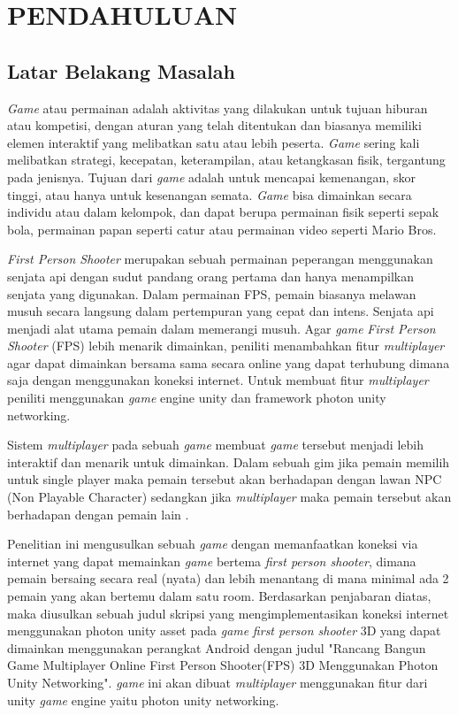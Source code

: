 \chapter{PENDAHULUAN}
\section{Latar Belakang Masalah}
\noindent

\textit{Game} atau permainan adalah aktivitas yang dilakukan untuk tujuan hiburan atau kompetisi, dengan aturan yang telah ditentukan dan biasanya memiliki elemen interaktif yang melibatkan satu atau lebih peserta. \textit{Game} sering kali melibatkan strategi, kecepatan, keterampilan, atau ketangkasan fisik, tergantung pada jenisnya. Tujuan dari \textit{game} adalah untuk mencapai kemenangan, skor tinggi, atau hanya untuk kesenangan semata. \textit{Game} bisa dimainkan secara individu atau dalam kelompok, dan dapat berupa permainan fisik seperti sepak bola, permainan papan seperti catur atau permainan video seperti Mario Bros\cite{fps}.

\textit{First Person Shooter} merupakan sebuah permainan peperangan menggunakan senjata api dengan sudut pandang orang pertama dan hanya menampilkan senjata yang digunakan.
Dalam permainan FPS, pemain biasanya melawan musuh secara langsung dalam pertempuran yang cepat dan intens\cite{fps}. Senjata api menjadi alat utama pemain dalam memerangi musuh.
Agar \textit{game} \textit{First Person Shooter} (FPS) lebih menarik dimainkan, peniliti menambahkan fitur \textit{multiplayer} agar dapat dimainkan bersama sama secara online yang dapat terhubung dimana saja dengan menggunakan koneksi internet. Untuk membuat fitur \textit{multiplayer} peniliti menggunakan \textit{game} engine unity dan framework photon unity networking.

Sistem \textit{multiplayer} pada sebuah \textit{\textit{game}} membuat \textit{\textit{game}} tersebut menjadi lebih interaktif dan menarik untuk dimainkan. Dalam sebuah gim jika pemain memilih untuk single player maka pemain tersebut akan berhadapan dengan lawan NPC (Non Playable Character) sedangkan jika \textit{multiplayer} maka pemain tersebut akan berhadapan dengan pemain lain \cite{Sarwodi}.


Penelitian ini mengusulkan sebuah \textit{\textit{game}} dengan memanfaatkan koneksi via internet yang dapat memainkan \textit{\textit{game}} bertema \textit{first person shooter}, dimana pemain bersaing secara real (nyata) dan lebih menantang di mana minimal ada 2 pemain yang akan bertemu dalam satu room.
Berdasarkan penjabaran diatas, maka diusulkan sebuah judul skripsi yang mengimplementasikan koneksi internet menggunakan photon unity asset pada \textit{\textit{game}} \textit{first person shooter} 3D yang dapat dimainkan menggunakan perangkat Android dengan judul "Rancang Bangun Game Multiplayer Online First Person Shooter(FPS) 3D Menggunakan Photon Unity Networking".
\textit{\textit{game}} ini akan dibuat \textit{multiplayer} menggunakan fitur dari unity \textit{\textit{game}} engine yaitu photon unity networking.

